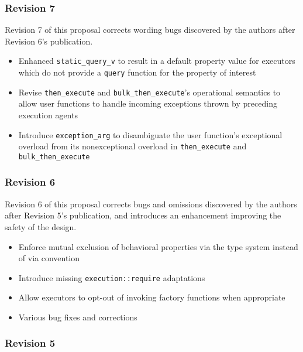 \documentclass[a4paper,12pt,notitlepage,twoside,openright]{article}
\begin{document}
\hypertarget{revision-7}{%
\subsubsection{Revision 7}\label{revision-7}}

Revision 7 of this proposal corrects wording bugs discovered by the
authors after Revision 6's publication.

\begin{itemize}

\item
  Enhanced \texttt{static_query_v} to result in a default
  property value for executors which do not provide a
  \texttt{query} function for the property of interest
\item
  Revise \texttt{then_execute} and
  \texttt{bulk_then_execute}'s operational semantics to
  allow user functions to handle incoming exceptions thrown by preceding
  execution agents
\item
  Introduce \texttt{exception_arg} to disambiguate the user
  function's exceptional overload from its nonexceptional overload in
  \texttt{then_execute} and
  \texttt{bulk_then_execute}
\end{itemize}

\hypertarget{revision-6}{%
\subsubsection{Revision 6}\label{revision-6}}

Revision 6 of this proposal corrects bugs and omissions discovered by
the authors after Revision 5's publication, and introduces an
enhancement improving the safety of the design.

\begin{itemize}

\item
  Enforce mutual exclusion of behavioral properties via the type system
  instead of via convention
\item
  Introduce missing \texttt{execution::require} adaptations
\item
  Allow executors to opt-out of invoking factory functions when
  appropriate
\item
  Various bug fixes and corrections
\end{itemize}

\hypertarget{revision-5}{%
\subsubsection{Revision 5}\label{revision-5}}
\end{document}
